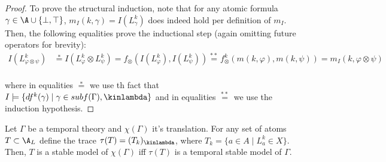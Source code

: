 \begin{proof}
  To prove the structural induction, note that for any atomic formula
  $\gamma \in \A \cup \{ \bot, \top \}$,
  $m_I(k,\gamma) = I(L^k_\gamma)$ does indeed hold per definition of
  $m_I$. Then, the following equalities prove the inductional step
  (again omitting future operators for brevity):
  \begin{align*}
  I(L^k_{\varphi \otimes \psi}) &\stackrel{*}{=} I(L^k_{\varphi} \otimes L^k_{\psi})
  =  f_{\otimes}(I(L^k_\varphi),I(L^k_\psi)) 
  \stackrel{**}{=} f_{\otimes}^k(m(k,\varphi),m(k,\psi)) =  m_I(k,\varphi \otimes \psi)\\
  \end{align*}

  where in equalities $\stackrel{*}{=}$ we use th fact that $I \models
  \{ df^k(\gamma) \mid \gamma \in subf(\Gamma), \kinlambda
  \}$ and in equalities
  $\stackrel{**}{=}$ we use the induction hypothesis.
\end{proof}

\begin{corollary}\label{cor:bijection-of-sm}
  Let $\Gamma$ be a temporal theory and $\chi(\Gamma)$ it's
  translation. For any set of atoms $T \subset \A_L$ define the
  trace $\tau(T)=(T_k)_{\kinlambda}$, where
  $T_k = \{ a \in A \mid L_a^k \in X \}$. Then, $T$ is a stable model of
  $\chi(\Gamma)$ iff $\tau(T)$ is a temporal stable model of
  $\Gamma$.
\end{corollary}

